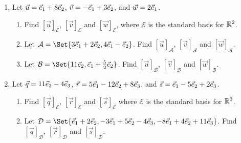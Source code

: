 \begin{exercises}

	\begin{problist}
		\prob
		\begin{enumerate}
			\item Let $\vec u={\vec e_1}+8{\vec e_2}$, $\vec v=-{\vec e_1}+ 3{\vec e_2}$,
				and $\vec w=2{\vec e_1}$.


				\begin{enumerate}
					\item Find $[\vec u]_{\mathcal E}$,
						$[\vec v]_{\mathcal E}$ and
						$[\vec w]_{\mathcal E}$, where $\mathcal
						E$ is the standard basis for $\mathbb{R}^{2}$.

					\item Let $\mathcal A=\Set{3\xhat+2\yhat,4\xhat-\yhat}$.
						Find $[\vec u]_{\mathcal A}$, $[\vec
						v]_{\mathcal A}$ and $[\vec w]_{\mathcal
						A}$.

					\item Let $\mathcal B=\Set{11\yhat,\xhat+\frac{5}{2}\yhat}$.
						Find $[\vec u]_{\mathcal B}$, $[\vec
						v]_{\mathcal B}$ and $[\vec w]_{\mathcal
						B}$.
				\end{enumerate}

			\item Let $\vec q=11{\vec e_2}-4{\vec e_3}$,
				$\vec r=5{\vec e_1}-12{\vec e_2}+8{\vec e_3}$, and $\vec s={\vec e_1}-5{\vec e_2}+2{\vec e_3}$.

				\begin{enumerate}
					\item Find $[\vec q]_{\mathcal E}$,
						$[\vec r]_{\mathcal E}$ and
						$[\vec s]_{\mathcal E}$ where
						$\mathcal E$ is the standard
						basis for $\mathbb{R}^{3}$.

					\item Let $\mathcal D=\Set{\xhat+2\yhat,-3\xhat+5\yhat-4\zhat,-8\xhat+4\yhat+11\zhat}$.
						Find $[\vec q]_{\mathcal D}$, $[\vec
						r]_{\mathcal D}$ and $[\vec s]_{\mathcal
						D}$.


\end{enumerate}
\end{enumerate}
\end{problist}
\end{exercises}
